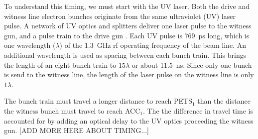\documentclass[portrait,final,paperwidth=105cm, paperheight=160cm,  fontscale=0.277]{baposter}
\begin{document}
\begin{poster}
{To understand this timing, we must start with the UV laser.
Both the drive and witness line electron bunches
originate from the same ultraviolet (UV) laser pulse. 
A network of UV optics and splitters deliver one laser 
pulse to the witness gun, and a pulse train to the drive gun \cite{korea}.
Each UV pulse is \SI{769}{ps} long, which is one wavelength ($\lambda$)
of the \SI{1.3}{GHz} rf operating frequency of the beam line.  
An additional wavelength is used as spacing between each bunch train.
This brings the length of an eight bunch train to $15\lambda$ or about \SI{11.5}{ns}.
Since only one bunch is send to the witness line, the length of the 
laser pulse on the witness line is only $1\lambda$.

The bunch train must travel a longer distance to reach PETS$_1$ 
than the distance the witness bunch must travel to reach ACC$_1$.
The the difference in travel time is accounted for by adding an optical delay 
to the UV optics proceeding the witness gun. 
[ADD MORE HERE ABOUT TIMING...]
}
\fi


\end{poster}
\end{document}
